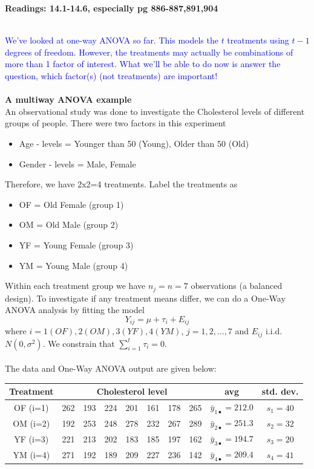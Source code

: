 \begin{center}\large\textbf{Readings: 14.1-14.6, especially pg 886-887,891,904%
}\\
\normalsize \end{center}
\large ~\hrulefill
~\\
\textcolor{blue}{We've looked at one-way ANOVA so far.  This models the $t$ treatments using $t-1$ degrees of freedom.  However, the treatments may actually be combinations of more than 1 factor of interest.  What we'll be able to do now is answer the question, which factor(s) (not treatments) are important!}\\~\\

\textbf{A multiway ANOVA example}\\
An observational study was done to investigate the Cholesterol levels of different groups of people.  There were two factors in this experiment
\begin{itemize}
\item Age - levels = Younger than 50 (Young), Older than 50 (Old)
\item Gender - levels = Male, Female
\end{itemize}
Therefore, we have 2x2=4 treatments.  Label the treatments as
\begin{itemize}
\item OF = Old Female (group 1)
\item OM = Old Male (group 2)
\item YF = Young Female (group 3)
\item YM = Young Male (group 4)
\end{itemize}
Within each treatment group we have $n_j=n=7$ observations (a balanced design).  To investigate if any treatment means differ, we can do a One-Way ANOVA analysis by fitting the model
$$Y_{ij} = \mu + \tau_i + E_{ij}$$
where $i=1 (OF),2 (OM),3 (YF),4 (YM)$, $j=1,2,\ldots,7$ and $E_{ij}$ i.i.d. $N(0,\sigma^2)$.  We constrain that $\sum_{i=1}^{t}\tau_i=0$. \\~\\
The data and One-Way ANOVA output are given below:
\begin{center}
\begin{tabular}{c|ccccccc|cc} \hline
Treatment & \multicolumn{7}{c}{Cholesterol level}& avg & std. dev. \\ \hline
OF (i=1) & 262 & 193 & 224 & 201 & 161 & 178 & 265 & $\bar{y}_{1\bullet}=212.0$& $s_{1}=40$\\ 
OM (i=2) & 192 & 253 & 248 & 278 & 232 & 267 & 289 & $\bar{y}_{2\bullet}=251.3$& $s_{2}=32$\\ 
YF (i=3) & 221 & 213 & 202 & 183 & 185 & 197 & 162 & $\bar{y}_{3\bullet}=194.7$ & $s_{3}=20$\\ 
YM (i=4) & 271 & 192 & 189 & 209 & 227 & 236 & 142 & $\bar{y}_{4\bullet}=209.4$& $s_{4}=41$\\ 
 \hline
\end{tabular}
\end{center}

